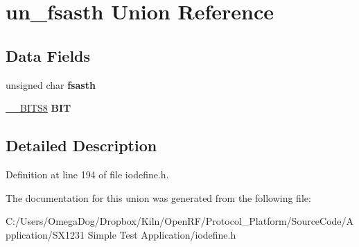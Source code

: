 \hypertarget{unionun__fsasth}{\section{un\-\_\-fsasth Union Reference}
\label{unionun__fsasth}
}
\subsection*{Data Fields}
\begin{DoxyCompactItemize}
\item 
\hypertarget{unionun__fsasth_adad078b54bf397de4ba37d14a2bfeba8}{unsigned char {\bfseries fsasth}}\label{unionun__fsasth_adad078b54bf397de4ba37d14a2bfeba8}

\item 
\hypertarget{unionun__fsasth_a3a6c559ccc5ea69f797dbec51e0943d2}{\hyperlink{struct_____b_i_t_s8}{\-\_\-\-\_\-\-B\-I\-T\-S8} {\bfseries B\-I\-T}}\label{unionun__fsasth_a3a6c559ccc5ea69f797dbec51e0943d2}

\end{DoxyCompactItemize}


\subsection{Detailed Description}


Definition at line 194 of file iodefine.\-h.



The documentation for this union was generated from the following file\-:\begin{DoxyCompactItemize}
\item 
C\-:/\-Users/\-Omega\-Dog/\-Dropbox/\-Kiln/\-Open\-R\-F/\-Protocol\-\_\-\-Platform/\-Source\-Code/\-Application/\-S\-X1231 Simple Test Application/iodefine.\-h\end{DoxyCompactItemize}
